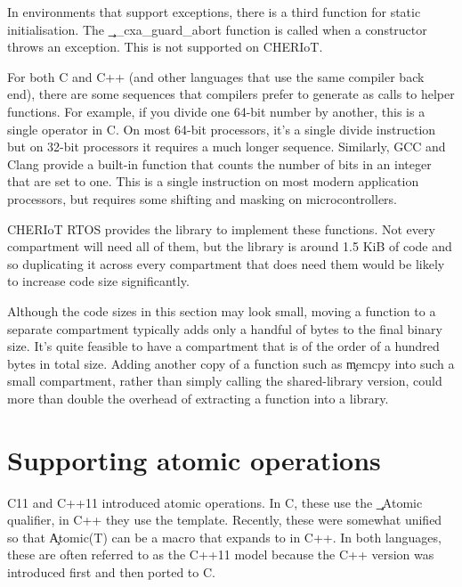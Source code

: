 \begin{note}
In environments that support exceptions, there is a third function for static initialisation.
The \c{__cxa_guard_abort} function is called when a constructor throws an exception.
This is not supported on CHERIoT.
\end{note}

For both C and C++ (and other languages that use the same compiler back end), there are some sequences that compilers prefer to generate as calls to helper functions.
For example, if you divide one 64-bit number by another, this is a single operator in C.
On most 64-bit processors, it's a single divide instruction but on 32-bit processors it requires a much longer sequence.
Similarly, GCC and Clang provide a  built-in function that counts the number of bits in an integer that are set to one.
This is a single instruction on most modern application processors, but requires some shifting and masking on microcontrollers.

CHERIoT RTOS provides the  library to implement these functions.
Not every compartment will need all of them, but the library is around 1.5 KiB of code and so duplicating it across every compartment that does need them would be likely to increase code size significantly.

Although the code sizes in this section may look small, moving a function to a separate compartment typically adds only a handful of bytes to the final binary size.
It's quite feasible to have a compartment that is of the order of a hundred bytes in total size.
Adding another copy of a function such as \c{memcpy} into such a small compartment, rather than simply calling the shared-library version, could more than double the overhead of extracting a function into a library.

\section{Supporting atomic operations}

C11 and C++11 introduced atomic operations.
In C, these use the \c{_Atomic} qualifier, in C++ they use the  template.
Recently, these were somewhat unified so that \c{Atomic(T)} can be a macro that expands to  in C++.
In both languages, these are often referred to as the C++11 model because the C++ version was introduced first and then ported to C.


